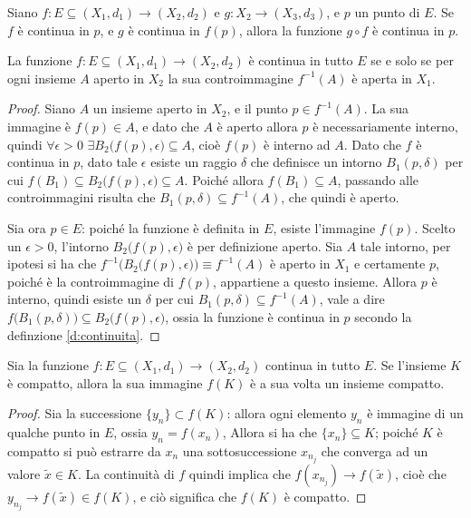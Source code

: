 \begin{teorema}
Siano $f\colon E\subseteq (X_1,d_1)\to(X_2,d_2)$ e $g\colon X_2\to (X_3,d_3)$, e $p$ un punto di $E$. Se $f$ è continua in $p$, e $g$ è continua in $f(p)$, allora la funzione $g\circ f$ è continua in $p$.
\end{teorema}
\begin{teorema}
La funzione $f\colon E\subseteq (X_1,d_1)\to(X_2,d_2)$ è continua in tutto $E$ se e solo se per ogni insieme $A$ aperto in $X_2$ la sua controimmagine $f^{-1}(A)$ è aperta in $X_1$.
\end{teorema}
\begin{proof}
Siano $A$ un insieme aperto in $X_2$, e il punto $p\in f^{-1}(A)$. La sua immagine è $f(p)\in A$, e dato che $A$ è aperto allora $p$ è necessariamente interno, quindi $\forall\epsilon>0$ $\exists B_2\big(f(p),\epsilon\big)\subseteq A$, cioè $f(p)$ è interno ad $A$. Dato che $f$ è continua in $p$, dato tale $\epsilon$ esiste un raggio $\delta$ che definisce un intorno $B_1(p,\delta)$ per cui $f(B_1)\subseteq B_2\big(f(p),\epsilon\big)\subseteq A$.  Poiché allora $f(B_1)\subseteq A$, passando alle controimmagini risulta che $B_1(p,\delta)\subseteq f^{-1}(A)$, che quindi è aperto.

Sia ora $p\in E$: poiché la funzione è definita in $E$, esiste l'immagine $f(p)$. Scelto un $\epsilon>0$, l'intorno $B_2\big(f(p),\epsilon\big)$ è per definizione aperto. Sia $A$ tale intorno, per ipotesi si ha che $f^{-1}\big(B_2\big(f(p),\epsilon\big)\big)\equiv f^{-1}(A)$ è aperto in $X_1$ e certamente $p$, poiché è la controimmagine di $f(p)$, appartiene a questo insieme. Allora $p$ è interno, quindi esiste un $\delta$ per cui $B_1(p,\delta)\subseteq f^{-1}(A)$, vale a dire $f\big(B_1(p,\delta)\big)\subseteq B_2\big(f(p),\epsilon\big)$, ossia la funzione è continua in $p$ secondo la definzione \ref{d:continuita}.
\end{proof}
\begin{teorema}
\label{t:comp_to_comp}
Sia la funzione $f\colon E\subseteq (X_1,d_1)\to(X_2,d_2)$ continua in tutto $E$. Se l'insieme $K$ è compatto, allora la sua immagine $f(K)$ è a sua volta un insieme compatto.
\end{teorema}
\begin{proof}
Sia la successione $\{y_n\}\subset f(K)$: allora ogni elemento $y_n$ è immagine di un qualche punto in $E$, ossia $y_n=f(x_n)$, Allora si ha che $\{x_n\}\subseteq K$; poiché $K$ è compatto si può estrarre da $x_n$ una sottosuccessione $x_{n_j}$ che converga ad un valore $\tilde{x}\in K$. La continuità di $f$ quindi implica che $f(x_{n_j})\to f(\tilde{x})$, cioè che $y_{n_j}\to f(\tilde{x})\in f(K)$, e ciò significa che $f(K)$ è compatto.
\end{proof}
